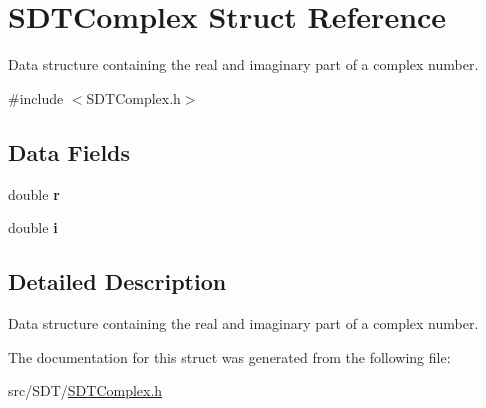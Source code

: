 \hypertarget{struct_s_d_t_complex}{}\section{S\+D\+T\+Complex Struct Reference}
\label{struct_s_d_t_complex}


Data structure containing the real and imaginary part of a complex number.  




{\ttfamily \#include $<$S\+D\+T\+Complex.\+h$>$}

\subsection*{Data Fields}
\begin{DoxyCompactItemize}
\item 
\hypertarget{struct_s_d_t_complex_a880a49112fedae68e714341a9a082fb6}{}double {\bfseries r}\label{struct_s_d_t_complex_a880a49112fedae68e714341a9a082fb6}

\item 
\hypertarget{struct_s_d_t_complex_a5659a38afd08966e6799fa0fb40a882a}{}double {\bfseries i}\label{struct_s_d_t_complex_a5659a38afd08966e6799fa0fb40a882a}

\end{DoxyCompactItemize}


\subsection{Detailed Description}
Data structure containing the real and imaginary part of a complex number. 

The documentation for this struct was generated from the following file\+:\begin{DoxyCompactItemize}
\item 
src/\+S\+D\+T/\hyperlink{_s_d_t_complex_8h}{S\+D\+T\+Complex.\+h}\end{DoxyCompactItemize}
